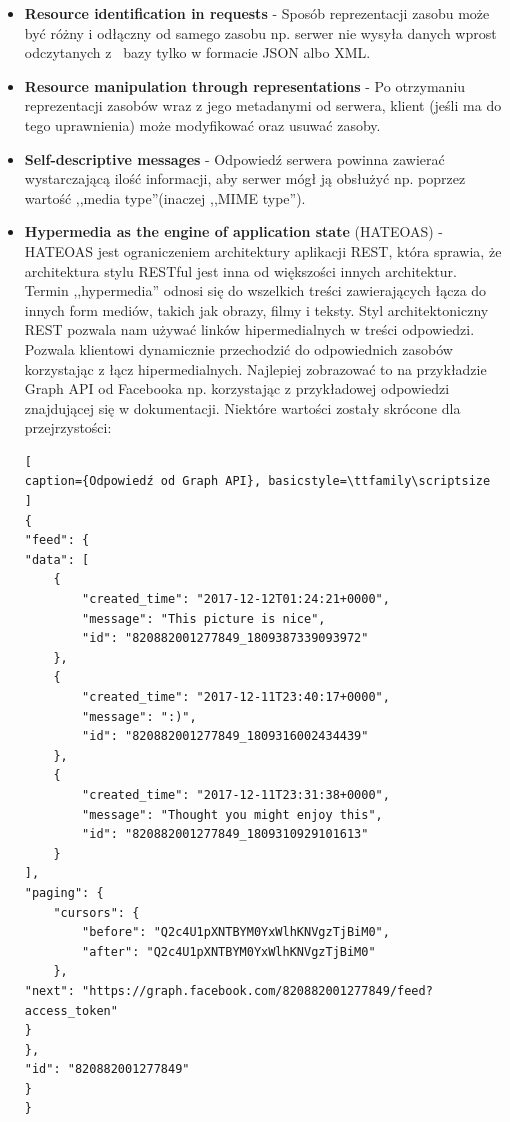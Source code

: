 \documentclass[oneside,polski,logo,indent]{amuthesis}
\begin{document}
\begin{itemize}
\begin{itemize}
\item \textbf{Resource identification in requests} - Sposób reprezentacji zasobu może być różny i odłączny od samego zasobu np. serwer nie wysyła danych wprost odczytanych z~ bazy tylko w formacie JSON albo XML.\newline 
\item \textbf{Resource manipulation through representations} - Po otrzymaniu reprezentacji zasobów wraz z jego metadanymi od serwera, klient (jeśli ma do tego uprawnienia) może modyfikować oraz usuwać zasoby.\newline 
\item \textbf{Self-descriptive messages} - Odpowiedź serwera powinna zawierać wystarczającą ilość informacji, aby serwer mógł ją obsłużyć np. poprzez wartość ,,media type''(inaczej ,,MIME type'').\newline 
\item \textbf{Hypermedia as the engine of application state} (HATEOAS) - HATEOAS jest ograniczeniem architektury aplikacji REST, która sprawia, że architektura stylu RESTful jest inna od większości innych architektur. Termin ,,hypermedia'' odnosi się do wszelkich treści zawierających łącza do innych form mediów, takich jak obrazy, filmy i teksty. Styl architektoniczny REST pozwala nam używać linków hipermedialnych w treści odpowiedzi. Pozwala klientowi dynamicznie przechodzić do odpowiednich zasobów korzystając z łącz hipermedialnych. Najlepiej zobrazować to na przykładzie Graph API od Facebooka np. korzystając z przykładowej odpowiedzi znajdującej się w dokumentacji. Niektóre wartości zostały skrócone dla przejrzystości: 


\begin{lstlisting}[
caption={Odpowiedź od Graph API}, basicstyle=\ttfamily\scriptsize
]
{
"feed": {
"data": [
    {
        "created_time": "2017-12-12T01:24:21+0000",
        "message": "This picture is nice",
        "id": "820882001277849_1809387339093972"
    },
    {
        "created_time": "2017-12-11T23:40:17+0000",
        "message": ":)",
        "id": "820882001277849_1809316002434439"
    },
    {
        "created_time": "2017-12-11T23:31:38+0000",
        "message": "Thought you might enjoy this",
        "id": "820882001277849_1809310929101613"
    }
],
"paging": {
    "cursors": {
        "before": "Q2c4U1pXNTBYM0YxWlhKNVgzTjBiM0",
        "after": "Q2c4U1pXNTBYM0YxWlhKNVgzTjBiM0"
    },
"next": "https://graph.facebook.com/820882001277849/feed?access_token"
}
},
"id": "820882001277849"
}
}
\end{lstlisting}


\end{itemize}
\end{itemize}
\end{document}
